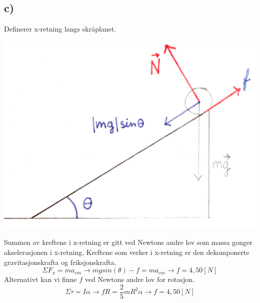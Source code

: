 \documentclass[12pt,a4paper]{article}
\begin{document}
    \subsection*{c)}
    Definerer x-retning langs skråplanet.
    \begin{center}
      \includegraphics{05_1c}
    \end{center}
    Summen av kreftene i x-retning er gitt ved Newtons andre lov som massa
    gonger akselerasjonen i x-retning. Kreftene som verker i x-retning er den
    dekomponerte gravitasjonskrafta og friksjonskrafta.
    \begin{equation}
      \Sigma F_x = ma_{cm} \rightarrow mgsin(\theta) - f = ma_{cm} \rightarrow f=4,50[N]
    \end{equation}
    Alternativt kan vi finne $f$ ved Newtons andre lov for rotasjon.
    \begin{equation}
      \Sigma \tau = I\alpha \rightarrow fR = \frac{2}{5}mR^2\alpha \rightarrow f=4,50[N]
    \end{equation}
\end{document}
